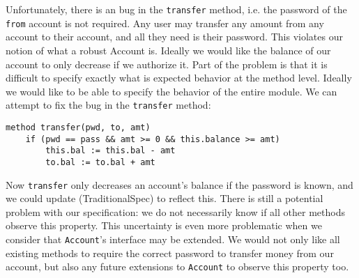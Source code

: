 \documentclass[acmsmall,review,anonymous]{acmart}\settopmatter{printfolios=true,printccs=false,printacmref=false}
\begin{document}
Unfortunately, there is an bug in the \texttt{transfer} method, 
i.e. the password of the \texttt{from} account is not required. Any user may transfer any amount 
from any account to their account, and all they need is their password. This violates our notion 
of what a robust Account is. Ideally we would like the balance of our account to only decrease 
if we authorize it.
Part of the problem is that 
it is difficult to specify exactly what is expected behavior at the method level. Ideally 
we would like to be able to specify the behavior of the entire module. We can attempt to 
fix the bug in the \texttt{transfer} method:
\begin{lstlisting}[mathescape=true]
method transfer(pwd, to, amt)
	if (pwd == pass && amt >= 0 && this.balance >= amt)
		this.bal := this.bal - amt
		to.bal := to.bal + amt
\end{lstlisting}
Now \texttt{transfer} only decreases an account's balance if the password is known, and
we could update (TraditionalSpec) to reflect this. There is still a potential problem 
with our specification: we do not necessarily know if all other methods observe this
property. This uncertainty is even more problematic when we consider that \texttt{Account}'s
interface may be extended. We would not only like all existing methods to require 
the correct password to transfer money from our account, but also any future extensions
to \texttt{Account} to observe this property too.
\end{document}
